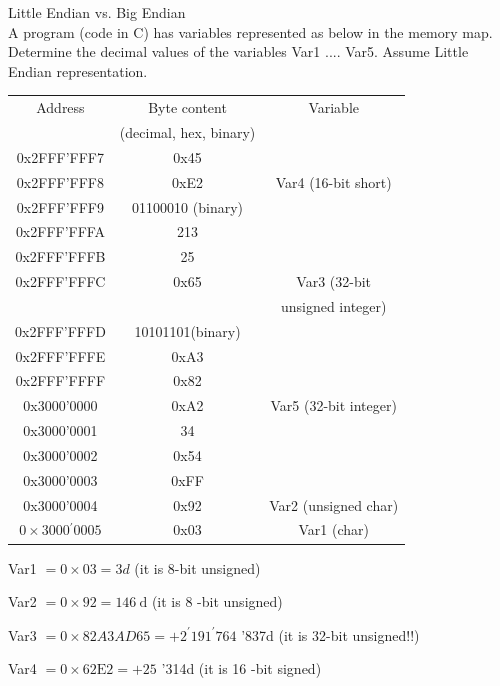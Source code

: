 \begin{example2}{Little Endian vs. Big Endian}\\
A program (code in C) has variables represented as below in the memory map. Determine the decimal values of the variables Var1 .... Var5. Assume Little Endian representation.
\begin{center}
\begin{tabular}{|c|c|c|}
\hline
Address & Byte content  & Variable \\
& (decimal, hex, binary) & \\
\hline
0x2FFF'FFF7 & 0x45 &  \\
\hline
0x2FFF'FFF8 & 0xE2 & Var4 (16-bit short) \\
\hline
0x2FFF'FFF9 & 01100010 (binary) &  \\
\hline
0x2FFF'FFFA & 213 &  \\
\hline
0x2FFF'FFFB & 25 &  \\
\hline
0x2FFF'FFFC & 0x65 & Var3 (32-bit  \\
& & unsigned integer) \\
\hline
0x2FFF'FFFD & 10101101(binary) &  \\
\hline
0x2FFF'FFFE & 0xA3 &  \\
\hline
0x2FFF'FFFF & 0x82 &  \\
\hline
0x3000'0000 & 0xA2 & Var5 (32-bit integer) \\
\hline
0x3000'0001 & 34 &  \\
\hline
0x3000'0002 & 0x54 &  \\
\hline
0x3000'0003 & 0xFF &  \\
\hline
0x3000'0004 & 0x92 & Var2 (unsigned char) \\
\hline
$0 \times 3000{ }^{\prime} 0005$ & 0x03 & Var1 (char) \\
\hline
\end{tabular}
\end{center}
Var1 $=0 \times 03=3 d$ (it is 8-bit unsigned)

Var2 $=0 \times 92=146 \mathrm{~d}$ (it is 8 -bit unsigned)

Var3 $=0 \times 82 A 3 A D 65=+2^{\prime} 191^{\prime} 764$ '837d (it is 32-bit unsigned!!)

Var4 $=0 \times 62 \mathrm{E} 2=+25$ '314d (it is 16 -bit signed)


\end{example2}
